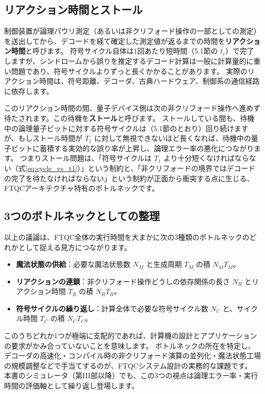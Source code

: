 \subsection{リアクション時間とストール}

制御装置が論理パウリ測定（あるいは非クリフォード操作の一部としての測定）を送出してから、デコードを経て確定した測定値が返るまでの時間を\textbf{リアクション時間}と呼びます。
符号サイクル自体は1回あたり短時間（5.1節の $t_c$）で完了しますが、シンドロームから誤りを推定するデコード計算は一般に計算量的に重い問題であり、符号サイクルよりずっと長くかかることがあります。
実際のリアクション時間は、符号距離、デコーダ、古典ハードウェア、制御系の通信経路に依存します。

このリアクション時間の間、量子デバイス側は次の非クリフォード操作へ進めず待たされます。この待機を\textbf{ストール}と呼びます。
ストールしている間も、待機中の論理量子ビットに対する符号サイクルは（5.1節のとおり）回り続けますが、もしストール時間が $T_1$ に対して無視できないほど長くなれば、待機中の量子ビットに蓄積する実効的な誤り率が上昇し、論理エラー率の悪化につながります。
つまりストール問題は、「符号サイクルは $T_1$ より十分短くなければならない（式\eqref{eq:cycle_vs_t1}）」という制約と、「非クリフォードの境界ではデコードの完了を待たなければならない」という制約が正面から衝突する点に生じる、FTQCアーキテクチャ特有のボトルネックです。

\subsection{3つのボトルネックとしての整理}

以上の議論は、FTQC全体の実行時間を大まかに次の3種類のボトルネックのどれかとして捉える見方につながります。

\begin{itemize}
  \item \textbf{魔法状態の供給}：必要な魔法状態数 $N_M$ と生成周期 $T_M$ の積 $N_M T_M$。
  \item \textbf{リアクションの連鎖}：非クリフォード操作どうしの依存関係の長さ $N_R$ とリアクション時間 $T_R$ の積 $N_R T_R$。
  \item \textbf{符号サイクルの繰り返し}：計算全体で必要な符号サイクル数 $N_C$ と、サイクル時間 $T_C$ の積 $N_C T_C$。
\end{itemize}

このうちどれか1つが極端に支配的であれば、計算機の設計とアプリケーションの要求がかみ合っていないことを意味します。
ボトルネックの所在を特定し、デコーダの高速化・コンパイル時の非クリフォード演算の並列化・魔法状態工場の規模調整などで手当てするのが、FTQCシステム設計の実務的な課題です。
本書のシミュレータ（第III部以降）でも、この3つの視点は論理エラー率・実行時間の評価軸として繰り返し登場します。

